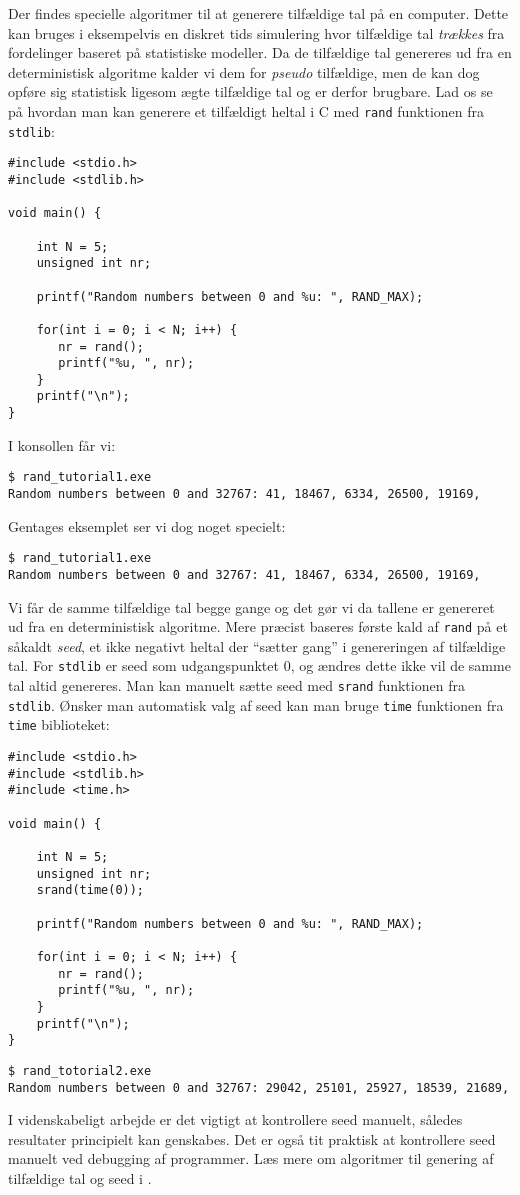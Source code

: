 Der findes specielle algoritmer til at generere tilfældige tal på en computer. Dette kan bruges i eksempelvis en diskret tids simulering hvor tilfældige tal \emph{trækkes} fra fordelinger baseret på statistiske modeller. Da de tilfældige tal genereres ud fra en deterministisk algoritme kalder vi dem for \emph{pseudo} tilfældige, men de kan dog opføre sig statistisk ligesom ægte tilfældige tal og er derfor brugbare. Lad os se på hvordan man kan generere et tilfældigt heltal i C med \texttt{rand} funktionen fra \texttt{stdlib}: 
\begin{lstlisting} 
#include <stdio.h>
#include <stdlib.h>

void main() {
    
    int N = 5; 
    unsigned int nr; 
    
    printf("Random numbers between 0 and %u: ", RAND_MAX); 
    
    for(int i = 0; i < N; i++) {
       nr = rand(); 
       printf("%u, ", nr);  
    }
    printf("\n"); 
}
\end{lstlisting}
\lstset{style=console,breaklines=true}
I konsollen får vi: 
\begin{lstlisting} 
$ rand_tutorial1.exe
Random numbers between 0 and 32767: 41, 18467, 6334, 26500, 19169,
\end{lstlisting}
Gentages eksemplet ser vi dog noget specielt: 
\begin{lstlisting} 
$ rand_tutorial1.exe
Random numbers between 0 and 32767: 41, 18467, 6334, 26500, 19169,
\end{lstlisting}
Vi får de samme tilfældige tal begge gange og det gør vi da tallene er genereret ud fra en deterministisk algoritme. Mere præcist baseres første kald af \texttt{rand} på et såkaldt \emph{seed}, et ikke negativt heltal der ``sætter gang'' i genereringen af tilfældige tal. For \texttt{stdlib} er seed som udgangspunktet $0$, og ændres dette ikke vil de samme tal altid genereres. Man kan manuelt sætte seed med \texttt{srand} funktionen fra \texttt{stdlib}. Ønsker man automatisk valg af seed kan man bruge \texttt{time} funktionen fra \texttt{time} biblioteket: 
\lstset{style = mystyle}
\begin{lstlisting} 
#include <stdio.h>
#include <stdlib.h>
#include <time.h>

void main() {
    
    int N = 5; 
    unsigned int nr;
    srand(time(0)); 
     
    printf("Random numbers between 0 and %u: ", RAND_MAX); 
    
    for(int i = 0; i < N; i++) {
       nr = rand(); 
       printf("%u, ", nr);  
    }
    printf("\n"); 
}
\end{lstlisting}
\lstset{style = console}
\begin{lstlisting}
$ rand_totorial2.exe
Random numbers between 0 and 32767: 29042, 25101, 25927, 18539, 21689,
\end{lstlisting}
I videnskabeligt arbejde er det vigtigt at kontrollere seed manuelt, således resultater principielt kan genskabes. Det er også tit praktisk at kontrollere seed manuelt ved debugging af programmer. Læs mere om algoritmer til genering af tilfældige tal og seed i \cite[282-283]{olofsson2012}. 